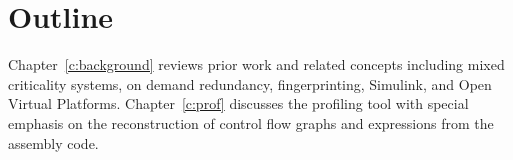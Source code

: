 \section{Outline}
	Chapter~\ref{c:background} reviews prior work and related concepts including mixed criticality systems, on demand redundancy, fingerprinting, Simulink, and Open Virtual Platforms. 
	Chapter~\ref{c:prof} discusses the profiling tool with special emphasis on the reconstruction of control flow graphs and expressions from the assembly code. 
